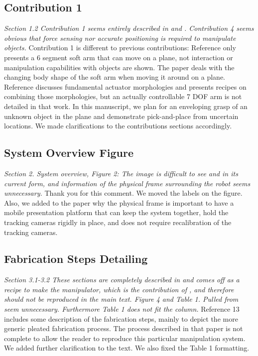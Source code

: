 \documentclass[letterpaper, 10 pt, twocolumn, conference]{article}
\begin{document}
\subsection{Contribution 1}
\textit{Section 1.2 Contribution 1 seems entirely described in \cite{marchese2014whole} and \cite{marchese2015recipe}. Contribution 4 seems obvious that force sensing nor accurate positioning is required to manipulate objects.}
%
Contribution 1 is different to previous contributions: Reference \cite{marchese2014whole} only presents a 6 segment soft arm that can move on a plane, not interaction or manipulation capabilities with objects are shown. The paper deals with the changing body shape of the soft arm when moving it around on a plane. Reference \cite{marchese2015recipe} discusses fundamental actuator morphologies and presents recipes on combining those morphologies, but an actually controllable 7 DOF arm is not detailed in that work. In this manuscript, we plan for an enveloping grasp of an unknown object in the plane and demonstrate pick-and-place from uncertain locations. We made clarifications to the contributions sections accordingly.
%
\subsection{System Overview Figure}
\textit{Section 2. System overview, Figure 2: The image is difficult to see and in its current form, and information of the physical frame surrounding the robot seems unnecessary.}
%
Thank you for this comment. We moved the labels on the figure. Also, we added to the paper why the physical frame is important to have a mobile presentation platform that can keep the system together, hold the tracking cameras rigidly in place, and does not require recalibration of the tracking cameras. 
%
\subsection{Fabrication Steps Detailing}
\textit{Section 3.1-3.2 These sections are completely described in \cite{marchese2015recipe}  and comes off as a recipe to make the manipulator, which is the contribution of \cite{marchese2015recipe}, and therefore should not be reproduced in the main text. Figure 4 and Table 1. Pulled from \cite{marchese2015recipe} seem unnecessary. Furthermore Table 1 does not fit the column.}
%
Reference 13 includes some description of the fabrication steps, mainly to depict the more generic pleated fabrication process.  The process described in that paper is not complete to allow the reader to reproduce this particular manipulation system. We added further clarification to the text. We also fixed the Table 1 formatting.
%
\end{document}
